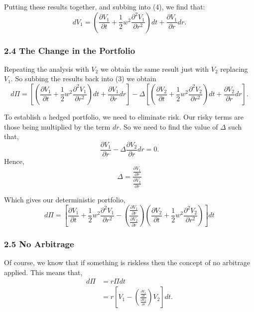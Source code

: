 \documentclass[11pt]{article}
\newcommand\ddfrac[2]{\frac{\displaystyle #1}{\displaystyle #2}}
\begin{document}
Putting these results together, and subbing into (4), we find that:
\begin{equation}
    dV_{1} = \left( \frac{\partial V_{1}}{\partial t} + \frac{1}{2} w^2 \frac{\partial^2 V_{1}}{\partial r^2} \right) dt + \frac{\partial V_{1}}{\partial r} dr. 
\end{equation}

\subsubsection*{2.4 The Change in the Portfolio}

Repeating the analysis with $V_{2}$ we obtain the same result just with $V_{2}$ replacing $V_{1}$. So subbing the results back into (3) we obtain
\begin{equation}
    d\Pi = \left[ \left( \frac{\partial V_{1}}{\partial t} + \frac{1}{2} w^2 \frac{\partial^2 V_{1}}{\partial r^2} \right) dt + \frac{\partial V_{1}}{\partial r} dr \right] - \Delta \left[ \left( \frac{\partial V_{2}}{\partial t} + \frac{1}{2} w^2 \frac{\partial^2 V_{2}}{\partial r^2} \right) dt + \frac{\partial V_{2}}{\partial r} dr \right].
\end{equation}

\newpage

To establish a hedged portfolio, we need to eliminate risk. Our risky terms are those being multiplied by the term $dr$. So we need to find the value of $\Delta$ such that,
\begin{equation}
    \frac{\partial V_{1}}{\partial r} - \Delta \frac{\partial V_{2}}{\partial r} dr = 0.
\end{equation}
Hence,
\begin{equation}
    \Delta = \ddfrac{\frac{\partial V_{1}}{\partial r}}{\frac{\partial V_{2}}{\partial r}}
\end{equation}

Which gives our deterministic portfolio,
\begin{equation}
    d\Pi = \left[ \frac{\partial V_{1}}{\partial t} + \frac{1}{2} w^2 \frac{\partial^2 V_{1}}{\partial r^2} - \left( \ddfrac{\frac{\partial V_{1}}{\partial r}}{\frac{\partial V_{2}}{\partial r}} \right) \left( \frac{\partial V_{2}}{\partial t} + \frac{1}{2} w^2 \frac{\partial^2 V_{2}}{\partial r^2} \right) \right] dt
\end{equation}

\subsubsection*{2.5 No Arbitrage}
Of course, we know that if something is riskless then the concept of no arbitrage applied. This means that,
\begin{align}
    d\Pi &= r \Pi dt \\
    &= r \left[ V_{1} - \left( \ddfrac{\frac{\partial V_{1}}{\partial r}}{\frac{\partial V_{2}}{\partial r}} \right) V_{2} \right] dt. 
\end{align}
\end{document}
